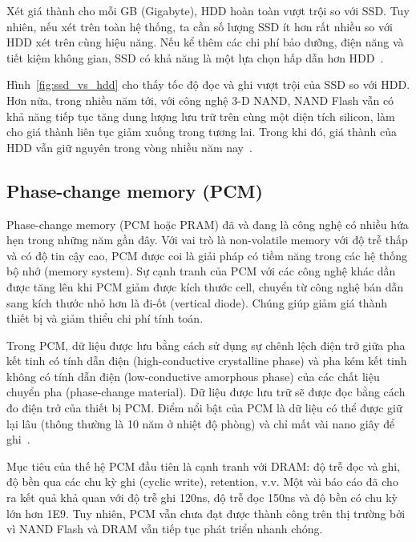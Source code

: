 Xét giá thành cho mỗi GB (Gigabyte), HDD hoàn toàn vượt trội so với SSD. Tuy
nhiên, nếu xét trên toàn hệ thống, ta cần số lượng SSD ít hơn rất nhiều so với
HDD xét trên cùng hiệu năng. Nếu kể thêm các chi phí bảo dưỡng, điện năng
và tiết kiệm không gian, SSD có khả năng là một lựa chọn hấp dẫn hơn
HDD~\cite{wongMarketApplicationsNAND2010}.

Hình~\ref{fig:ssd_vs_hdd} cho thấy tốc độ đọc và ghi vượt trội của SSD so với
HDD. Hơn nữa, trong nhiều năm tới, với công nghệ 3-D NAND, NAND Flash vẫn có khả
năng tiếp tục tăng dung lượng lưu trữ trên cùng một diện tích silicon, làm cho
giá thành liên tục giảm xuống trong tương lai. Trong khi đó, giá thành của HDD
vẫn giữ nguyên trong vòng nhiều năm
nay~\cite{monziocompagnoniReviewingEvolutionNAND2017}.



\subsection{Phase-change memory (PCM)}
Phase-change memory (PCM hoặc PRAM) đã và đang là công nghệ có nhiều hứa hẹn
trong những năm gần đây. Với vai trò là non-volatile memory với độ trễ thấp và
có độ tin cậy cao, PCM được coi là giải pháp có tiềm năng trong các hệ thống bộ
nhớ (memory system). Sự cạnh tranh của PCM với các công nghệ khác dần được tăng
lên khi PCM giảm được kích thước cell, chuyển từ công nghệ bán dẫn sang kích
thước nhỏ hơn là đi-ốt (vertical diode). Chúng giúp giảm giá thành thiết bị và
giảm thiểu chi phí tính toán.

Trong PCM, dữ liệu được lưu bằng cách sử dụng sự chênh lệch điện trở giữa pha
kết tinh có tính dẫn điện (high-conductive crystalline phase) và pha kém kết
tinh không có tính dẫn điện (low-conductive amorphous phase) của các chất liệu
chuyển pha (phase-change material). Dữ liệu được lưu trữ sẽ được đọc bằng cách
đo điện trở của thiết bị PCM. Điểm nổi bật của PCM là dữ liệu có thể được giữ
lại lâu (thông thường là 10 năm ở nhiệt độ phòng) và chỉ mất vài nano giây để
ghi~\cite{galloOverviewPhasechangeMemory2020}.

Mục tiêu của thế hệ PCM đầu tiên là cạnh tranh với DRAM: độ trễ đọc và ghi, độ
bền qua các chu kỳ ghi (cyclic write), retention, v.v. Một vài báo cáo đã cho
ra kết quả khả quan với độ trễ ghi 120ns, độ trễ đọc 150ns và độ bền có chu kỳ
lớn hơn 1E9. Tuy nhiên, PCM vẫn chưa đạt được thành công trên thị trường bởi vì
NAND Flash và DRAM vẫn tiếp tục phát triển nhanh chóng.

